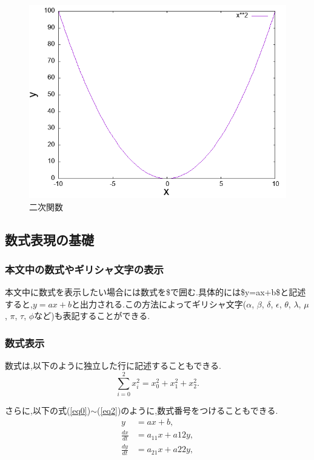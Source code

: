 \documentclass[a4paper, 11pt, titlepage]{jsarticle}
\begin{document}
\begin{figure}[htbp]
    \centering
    \includegraphics[width=120mm]{graph.png}
    \caption{二次関数}
    \label{fig1}
\end{figure}
\newpage




\subsection{数式表現の基礎}
\subsubsection{本文中の数式やギリシャ文字の表示}
本文中に数式を表示したい場合には数式を\$で囲む.具体的には\$y=ax+b\$と記述すると,$y=ax+b$と出力される.この方法によってギリシャ文字($\alpha $, $\beta $, $\delta $, $\epsilon $, $\theta $, $\lambda $, $\mu $, $\pi $, $\tau $, $\phi $など)も表記することができる.
 
\subsubsection{数式表示}
数式は,以下のように独立した行に記述することもできる.
\[
\sum _{i=0}^{2} x_i^2 = x_0^2+x_1^2+x_2^2.
\]

さらに,以下の式(\ref{eq0})$\sim $(\ref{eq2})のように,数式番号をつけることもできる.
\begin{align}
y &= ax+b, \label{eq0}\\
\frac{dx}{dt} &=a_{11}x+a{12}y, \label{eq1}\\
\frac{dy}{dt} &=a_{21}x+a{22}y, \label{eq2}
\end{align}
\end{document}
